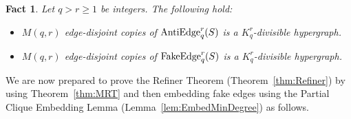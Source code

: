 \documentclass[11pt]{article}
\newcounter{i}
\theoremstyle{plain}
\newtheorem{fact}[thm]{Fact}
\theoremstyle{plain} %
\theoremstyle{definition}
\begin{document}

\begin{fact}\label{fact:Div2}
Let $q> r \ge 1$ be integers. The following hold:
\begin{itemize}
    \item[(1)] $M(q,r)$ edge-disjoint copies of ${\rm AntiEdge}_q^r(S)$ is a $K_q^r$-divisible hypergraph. 
    \item[(2)] $M(q,r)$ edge-disjoint copies of ${\rm FakeEdge}_q^r(S)$ is a $K_q^r$-divisible hypergraph. 
\end{itemize}
\end{fact}


We are now prepared to prove the Refiner Theorem (Theorem~\ref{thm:Refiner}) by using Theorem~\ref{thm:MRT} and then embedding fake edges using the Partial Clique Embedding Lemma (Lemma~\ref{lem:EmbedMinDegree}) as follows.
\end{document}
